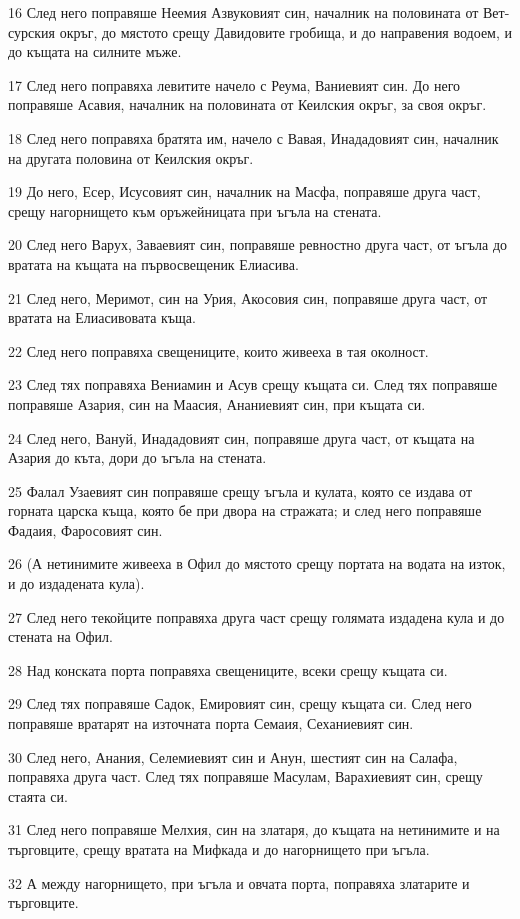 \par 16 След него поправяше Неемия Азвуковият син, началник на половината от Вет-сурския окръг, до мястото срещу Давидовите гробища, и до направения водоем, и до къщата на силните мъже.
\par 17 След него поправяха левитите начело с Реума, Ваниевият син. До него поправяше Асавия, началник на половината от Кеилския окръг, за своя окръг.
\par 18 След него поправяха братята им, начело с Вавая, Инададовият син, началник на другата половина от Кеилския окръг.
\par 19 До него, Есер, Исусовият син, началник на Масфа, поправяше друга част, срещу нагорнището към оръжейницата при ъгъла на стената.
\par 20 След него Варух, Заваевият син, поправяше ревностно друга част, от ъгъла до вратата на къщата на първосвещеник Елиасива.
\par 21 След него, Меримот, син на Урия, Акосовия син, поправяше друга част, от вратата на Елиасивовата къща.
\par 22 След него поправяха свещениците, които живееха в тая околност.
\par 23 След тях поправяха Вениамин и Асув срещу къщата си. След тях поправяше поправяше Азария, син на Маасия, Ананиевият син, при къщата си.
\par 24 След него, Вануй, Инададовият син, поправяше друга част, от къщата на Азария до къта, дори до ъгъла на стената.
\par 25 Фалал Узаевият син поправяше срещу ъгъла и кулата, която се издава от горната царска къща, която бе при двора на стражата; и след него поправяше Фадаия, Фаросовият син.
\par 26 (А нетинимите живееха в Офил до мястото срещу портата на водата на изток, и до издадената кула).
\par 27 След него текойците поправяха друга част срещу голямата издадена кула и до стената на Офил.
\par 28 Над конската порта поправяха свещениците, всеки срещу къщата си.
\par 29 След тях поправяше Садок, Емировият син, срещу къщата си. След него поправяше вратарят на източната порта Семаия, Сеханиевият син.
\par 30 След него, Анания, Селемиевият син и Анун, шестият син на Салафа, поправяха друга част. След тях поправяше Масулам, Варахиевият син, срещу стаята си.
\par 31 След него поправяше Мелхия, син на златаря, до къщата на нетинимите и на търговците, срещу вратата на Мифкада и до нагорнището при ъгъла.
\par 32 А между нагорнището, при ъгъла и овчата порта, поправяха златарите и търговците.

